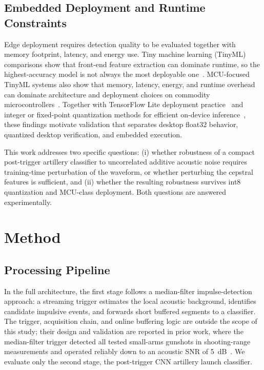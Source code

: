 ﻿\documentclass[conference]{IEEEtran}
\begin{document}
\subsection{Embedded Deployment and Runtime Constraints}
Edge deployment requires detection quality to be evaluated together with memory footprint, latency, and energy use. Tiny machine learning (TinyML) comparisons show that front-end feature extraction can dominate runtime, so the highest-accuracy model is not always the most deployable one~\cite{muthumala2024tinyml_ae}. MCU-focused TinyML systems also show that memory, latency, energy, and runtime overhead can dominate architecture and deployment choices on commodity microcontrollers~\cite{lin2020mcunet,banbury2021micronets}. Together with TensorFlow Lite deployment practice~\cite{tflite,david2021tflm} and integer or fixed-point quantization methods for efficient on-device inference~\cite{jacob2018quantization,benkhalifa2024stm32_quantization}, these findings motivate validation that separates desktop float32 behavior, quantized desktop verification, and embedded execution.

This work addresses two specific questions: (i) whether robustness of a compact post-trigger artillery classifier to uncorrelated additive acoustic noise requires training-time perturbation of the waveform, or whether perturbing the cepstral features is sufficient, and (ii) whether the resulting robustness survives int8 quantization and MCU-class deployment. Both questions are answered experimentally.

\section{Method}
\subsection{Processing Pipeline}\label{sec:pipeline}
In the full architecture, the first stage follows a median-filter impulse-detection approach: a streaming trigger estimates the local acoustic background, identifies candidate impulsive events, and forwards short buffered segments to a classifier. The trigger, acquisition chain, and online buffering logic are outside the scope of this study; their design and validation are reported in prior work, where the median-filter trigger detected all tested small-arms gunshots in shooting-range measurements and operated reliably down to an acoustic SNR of 5~dB~\cite{svatos2019smart_acoustic_sensor}. We evaluate only the second stage, the post-trigger CNN artillery launch classifier.
\end{document}
